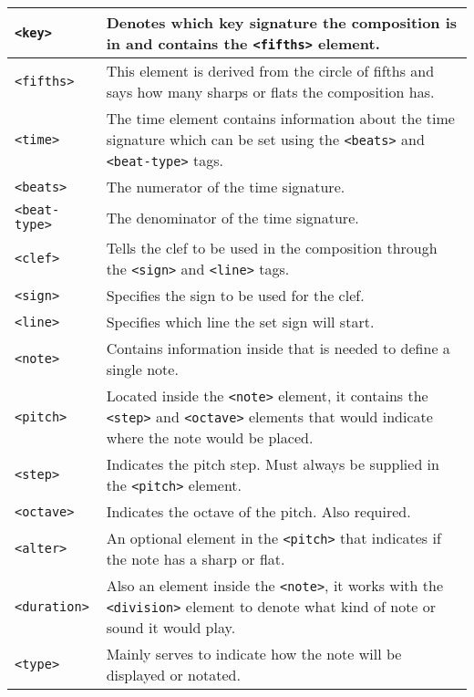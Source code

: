 \begin{longtable}{|p{3.6cm}|p{10cm}|}
        \texttt{<key>} & Denotes which key signature the composition is in and contains the \texttt{<fifths>} element. \\ \hline
        
        \texttt{<fifths>} & This element is derived from the circle of fifths and says how many sharps or flats the composition has. \\ \hline
        
        \texttt{<time>} & The time element contains information about the time signature which can be set using the \texttt{<beats>} and \texttt{<beat-type>} tags. \\ \hline
        
        \texttt{<beats>} & The numerator of the time signature. \\ \hline
        
        \texttt{<beat-type>} & The denominator of the time signature. \\ \hline
        
        \texttt{<clef>} & Tells the clef to be used in the composition through the \texttt{<sign>} and \texttt{<line>} tags. \\ \hline
        
        \texttt{<sign>} & Specifies the sign to be used for the clef.\\ \hline
        
        \texttt{<line>} & Specifies which line the set sign will start. \\ \hline
        
        \texttt{<note>} & Contains information inside that is needed to define a single note. \\ \hline
        
        \texttt{<pitch>} & Located inside the \texttt{<note>} element, it contains the \texttt{<step>} and \texttt{<octave>} elements that would indicate where the note would be placed. \\ \hline
        
        \texttt{<step>} & Indicates the pitch step. Must always be supplied in the \texttt{<pitch>} element. \\ \hline
        
        \texttt{<octave>} & Indicates the octave of the pitch. Also required. \\ \hline

        \texttt{<alter>} & An optional element in the \texttt{<pitch>} that indicates if the note has a sharp or flat. \\ \hline
        
        \texttt{<duration>} & Also an element inside the \texttt{<note>}, it works with the \texttt{<division>} element to denote what kind of note or sound it would play. \\ \hline
        
        \texttt{<type>} & Mainly serves to indicate how the note will be displayed or notated. \\ \hline


\end{longtable}

